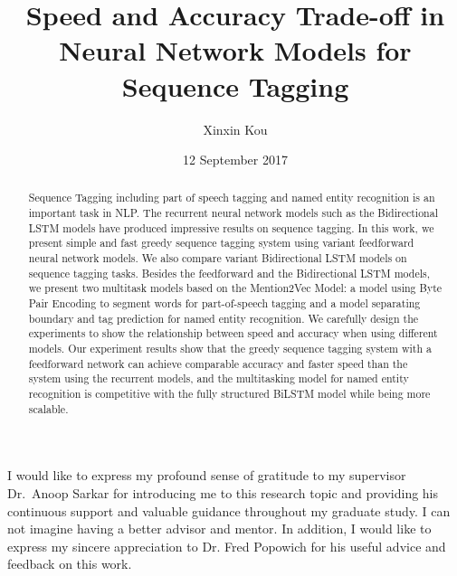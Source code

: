 \documentclass{sfuthesis}
\title{Speed and Accuracy Trade-off in Neural Network Models for Sequence Tagging}
\author{Xinxin Kou}
\date{12 September 2017}
\begin{document}
\frontmatter
\maketitle{}
\makecommittee{}

\begin{abstract}
Sequence Tagging including part of speech tagging and named entity recognition is an important task in NLP. The recurrent neural network models such as the Bidirectional LSTM models have produced impressive results on sequence tagging. In this work, we present simple and fast greedy sequence tagging system using variant feedforward neural network models. We also compare variant Bidirectional LSTM models on sequence tagging tasks. Besides the feedforward and the Bidirectional LSTM models, we present two multitask models based on the Mention2Vec Model: a model using Byte Pair Encoding to segment words for part-of-speech tagging and a model separating boundary and tag prediction for named entity recognition. We carefully design the experiments to show the relationship between speed and accuracy when using different models. Our experiment results show that the greedy sequence tagging system with a feedforward network can achieve comparable accuracy and faster speed than the system using the recurrent models, and the multitasking model for named entity recognition is competitive with the fully structured BiLSTM model while being more scalable.

\end{abstract}


\begin{acknowledgements} %

I would like to express my profound sense of gratitude to my supervisor Dr.\ Anoop Sarkar for introducing me to this research
topic and providing his continuous support and valuable guidance throughout my graduate study. I can not imagine having a better advisor and mentor. In addition, I would like to express my sincere appreciation to Dr. Fred Popowich for his useful advice and feedback on this work.




\end{acknowledgements}

\tableofcontents\clearpage
{}\listoftables\clearpage
{}\listoffigures





%
%
\end{document}
